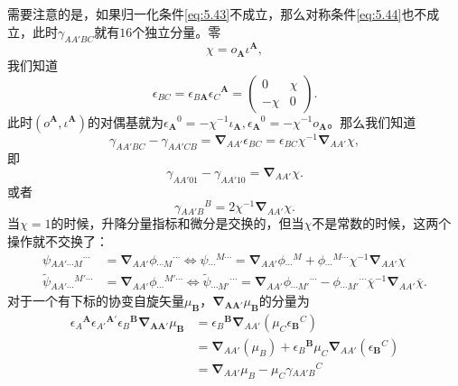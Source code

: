 需要注意的是，如果归一化条件\ref{eq:5.43}不成立，那么对称条件\ref{eq:5.44}也不成立，此时$\gamma _{AA'BC}$就有$16$个独立分量。零
\begin{equation*}
	\chi =o_{\boldsymbol{A}} \iota ^{\boldsymbol{A}} ,
\end{equation*}
我们知道
\begin{equation*}
	\epsilon _{BC} =\epsilon _{B\boldsymbol{A}} \epsilon {_{C}}^{\boldsymbol{A}} =\begin{pmatrix}
		0 & \chi \\
		-\chi  & 0
	\end{pmatrix} .
\end{equation*}
此时$(o^{\boldsymbol{A}} ,\iota ^{\boldsymbol{A}} )$的对偶基就为$\epsilon {_{\boldsymbol{A}}}^{0} =-\chi ^{-1} \iota _{\boldsymbol{A}} ,\epsilon {_{\boldsymbol{A}}}^{0} =-\chi ^{-1} o_{\boldsymbol{A}}$。那么我们知道
\begin{equation*}
	\gamma _{AA'BC} -\gamma _{AA'CB} =\boldsymbol{\nabla }_{AA'} \epsilon _{BC} =\epsilon _{BC} \chi ^{-1}\boldsymbol{\nabla }_{AA'} \chi ,
\end{equation*}
即
\begin{equation*}
	\gamma _{AA'01} -\gamma _{AA'10} =\boldsymbol{\nabla }_{AA'} \chi .
\end{equation*}
或者
\begin{equation*}
	\gamma {_{AA'B}}^{B} =2\chi ^{-1}\boldsymbol{\nabla }_{AA'} \chi .
\end{equation*}
当$\chi =1$的时候，升降分量指标和微分是交换的，但当$\chi $不是常数的时候，这两个操作就不交换了：
\begin{equation*}
	\begin{aligned}
		\psi {_{AA'\cdots M}}^{\cdots } & =\boldsymbol{\nabla }_{AA'} \phi {_{\cdots M}}^{\cdots } \Leftrightarrow \psi {_{\cdots }}^{M\cdots } =\boldsymbol{\nabla }_{AA'} \phi {_{\cdots }}^{M} +\phi {_{\cdots }}^{M\cdots } \chi ^{-1}\boldsymbol{\nabla }_{AA'} \chi \\
		\tilde{\psi }{_{AA'\cdots }}^{M'\cdots } & =\boldsymbol{\nabla }_{AA'} \phi {_{\cdots }}^{M'\cdots } \Leftrightarrow \tilde{\psi }{_{\cdots M'}}^{\cdots } =\boldsymbol{\nabla }_{AA'} \phi {_{\cdots M'}}^{\cdots } -\phi {_{\cdots M'}}^{\cdots }\overline{\chi }^{-1}\boldsymbol{\nabla }_{AA'}\overline{\chi } .
	\end{aligned}
\end{equation*}
对于一个有下标的协变自旋矢量$\mu _{\boldsymbol{B}}$，$\boldsymbol{\nabla }_{\boldsymbol{AA} '} \mu _{\boldsymbol{B}}$的分量为
\begin{equation*}
	\begin{aligned}
		\epsilon {_{A}}^{\boldsymbol{A}} \epsilon {_{A'}}^{\boldsymbol{A} '} \epsilon {_{B}}^{\boldsymbol{B}}\mathbf{\nabla }_{\boldsymbol{AA} '} \mu _{\boldsymbol{B}} & =\epsilon {_{B}}^{\boldsymbol{B}}\mathbf{\nabla }_{AA'} (\mu _{C} \epsilon {_{\boldsymbol{B}}}^{C} )\\
		& =\mathbf{\nabla }_{AA'} (\mu _{B} )+\epsilon {_{B}}^{\boldsymbol{B}} \mu _{C}\mathbf{\nabla }_{AA'} (\epsilon {_{\boldsymbol{B}}}^{C} )\\
		& =\mathbf{\nabla }_{AA'} \mu _{B} -\mu _{C} \gamma {_{AA'B}}^{C}
	\end{aligned}
\end{equation*}
